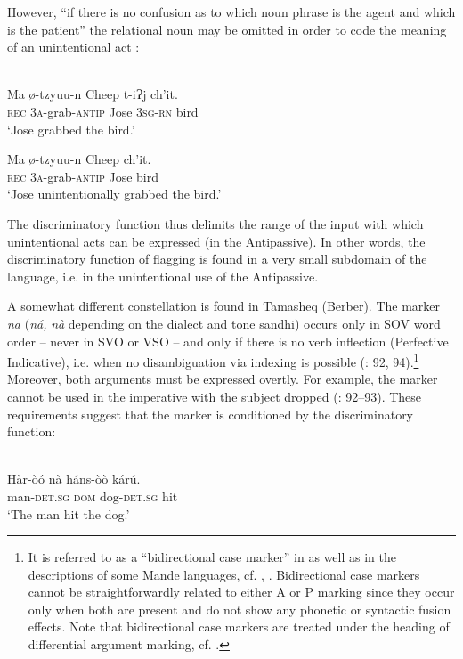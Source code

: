 \documentclass[output=paper]{langsci/langscibook}
\begin{document}
However, “if there is no confusion as to which noun phrase is the agent and which is the patient” the relational noun may be omitted in order to code the meaning of an unintentional act \citep[212]{England1983}:

\ea\label{ex:serzant:}
\\
\ea
\gll  Ma  ø-tzyuu-n   Cheep   t-iɁj    ch'it. \\
     \textsc{rec} 3\textsc{a}{}-grab-\textsc{antip}   Jose   3\textsc{sg}{}-\textsc{rn} bird\\
\glt ‘Jose grabbed the bird.’

\ex
\gll Ma  ø-tzyuu-n   Cheep   ch'it. \\
     \textsc{rec} 3\textsc{a}{}-grab-\textsc{antip}   Jose   bird\\
\glt ‘Jose unintentionally grabbed the bird.’
\z
\z

The discriminatory function thus delimits the range of the input with which unintentional acts can be expressed (in the Antipassive). In other words, the discriminatory function of flagging is found in a very small subdomain of the language, i.e. in the unintentional use of the Antipassive.

A somewhat different constellation is found in Tamasheq (Berber). The marker \textit{na} (\textit{ná,} \textit{nà} depending on the dialect and tone sandhi) occurs only in SOV word order – never in SVO or VSO – and only if there is no verb inflection (Perfective Indicative), i.e. when no disambiguation via indexing is possible (\citealt{Heath2007}: 92, 94).\footnote{It is referred to as a “bidirectional case marker” in \citet{Heath2007} as well as in the descriptions of some Mande languages, cf. \citet{Diagana1995}, \citet{Nikitina2018}. Bidirectional case markers cannot be straightforwardly related to either A or P marking since they occur only when both are present and do not show any phonetic or syntactic fusion effects. Note that bidirectional case markers are treated under the heading of differential argument marking, cf. \citet{Nikitina2018}.} Moreover, both arguments must be expressed overtly. For example, the marker cannot be used in the imperative with the subject dropped (\citealt{Heath2007}: 92–93). These requirements suggest that the marker is conditioned by the discriminatory function:

\ea\label{ex:serzant:}
\\
\gll Hàr-òó    nà  háns-òò  kárú.\\
     man-\textsc{det.sg}  \textsc{dom}  dog-\textsc{det.sg}  hit\\
\glt ‘The man hit the dog.’
\z
\end{document}
